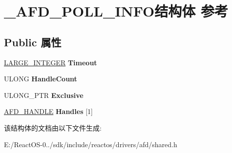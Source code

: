 \hypertarget{struct___a_f_d___p_o_l_l___i_n_f_o}{}\section{\+\_\+\+A\+F\+D\+\_\+\+P\+O\+L\+L\+\_\+\+I\+N\+F\+O结构体 参考}
\label{struct___a_f_d___p_o_l_l___i_n_f_o}
\subsection*{Public 属性}
\begin{DoxyCompactItemize}
\item 
\mbox{\label{struct___a_f_d___p_o_l_l___i_n_f_o_a0504993706eef7ab023467030519adb9}} 
\hyperlink{union___l_a_r_g_e___i_n_t_e_g_e_r}{L\+A\+R\+G\+E\+\_\+\+I\+N\+T\+E\+G\+ER} {\bfseries Timeout}
\item 
\mbox{\label{struct___a_f_d___p_o_l_l___i_n_f_o_a5ce8e77d755ee68890c187dfebe4efd0}} 
U\+L\+O\+NG {\bfseries Handle\+Count}
\item 
\mbox{\label{struct___a_f_d___p_o_l_l___i_n_f_o_aa2241ba392843bcf11a4c10dcfc96751}} 
U\+L\+O\+N\+G\+\_\+\+P\+TR {\bfseries Exclusive}
\item 
\mbox{\label{struct___a_f_d___p_o_l_l___i_n_f_o_a6dcd6fc8babc7f3c9b30f9d88158adca}} 
\hyperlink{struct___a_f_d___h_a_n_d_l_e__}{A\+F\+D\+\_\+\+H\+A\+N\+D\+LE} {\bfseries Handles} \mbox{[}1\mbox{]}
\end{DoxyCompactItemize}


该结构体的文档由以下文件生成\+:\begin{DoxyCompactItemize}
\item 
E\+:/\+React\+O\+S-\/0../sdk/include/reactos/drivers/afd/shared.\+h\end{DoxyCompactItemize}
